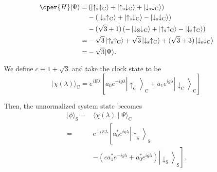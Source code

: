 \begin{equation}
\begin{aligned}
\oper{H}|\Psi\rangle= & \left(\left|\uparrow_{\mathrm{s}} \uparrow_{\mathrm{C}}\right\rangle+\left|\uparrow_{\mathrm{s}} \downarrow_{\mathrm{C}}\right\rangle+\left|\downarrow_{\mathrm{s}} \downarrow_{\mathrm{C}}\right\rangle\right) \\
& -\left(\left|\downarrow_{\mathrm{s}} \uparrow_{\mathrm{C}}\right\rangle+\left|\uparrow_{\mathrm{s}} \downarrow_{\mathrm{C}}\right\rangle-\left|\downarrow_{\mathrm{s}} \downarrow_{\mathrm{C}}\right\rangle\right) \\
& -(\sqrt{3}+1)\left(-\left|\downarrow_{\mathrm{S}} \downarrow_{\mathrm{C}}\right\rangle+\left|\uparrow_{\mathrm{s}} \uparrow_{\mathrm{C}}\right\rangle-\left|\downarrow_{\mathrm{s}} \uparrow_{\mathrm{C}}\right\rangle\right) \\
= & -\sqrt{3}\left|\uparrow_{\mathrm{s}} \uparrow_{\mathrm{C}}\right\rangle+\sqrt{3}\left|\downarrow_{\mathrm{s}} \uparrow_{\mathrm{C}}\right\rangle+(\sqrt{3}+3)\left|\downarrow_{\mathrm{s}} \downarrow_{\mathrm{C}}\right\rangle \\
= & -\sqrt{3}|\Psi\rangle .
\end{aligned}
\end{equation}

We define $c \equiv 1+\sqrt{3}$ and take the clock state to be
\begin{equation}
|\chi(\lambda)\rangle_{\mathrm{C}}=e^{i E \lambda}\left[a_0 e^{-i g \lambda}\left|\uparrow_{\mathrm{C}}\right\rangle_{\mathrm{C}}+a_1 e^{i g \lambda}\left|\downarrow_{\mathrm{C}}\right\rangle_{\mathrm{C}}\right]
\end{equation}

Then, the unnormalized system state becomes
\begin{equation}
\begin{aligned}
|\phi\rangle_{\mathrm{S}}= & \langle\chi(\lambda) \mid \Psi\rangle_{\mathrm{C}} \\
= & e^{-i E \lambda}\left[a_0^* e^{i g \lambda}\left|\uparrow_{\mathrm{S}}\right\rangle_{\mathrm{S}}\right. \\
& \left.-\left(c a_1^* e^{-i g \lambda}+a_0^* e^{i g \lambda}\right)\left|\downarrow_{\mathrm{S}}\right\rangle_{\mathrm{S}}\right] .
\end{aligned}
\end{equation}

